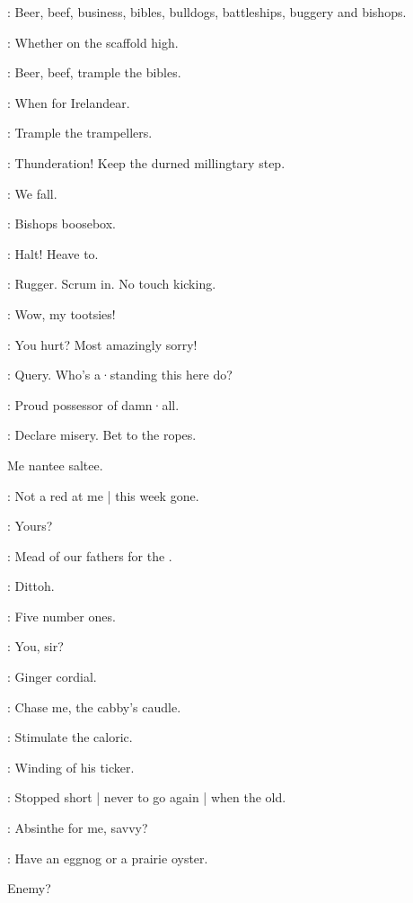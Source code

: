 \madden:
Beer,
beef,
business,
bibles,
bulldogs,
battleships,
buggery and bishops.%

\dixon:
Whether on the scaffold high.

\madden:
Beer,
beef,
trample the bibles.

\dixon:
When for Irelandear.

\crotthers:
Trample the trampellers.

\lenehan:
Thunderation!
Keep the durned millingtary step.

\madden:
We fall.

\dixon:
Bishops boosebox.

\punch:
Halt!
Heave to.

\dixon:
Rugger.
Scrum in.
No touch kicking.

\lynch:
Wow,
my tootsies!

\dixon:
You hurt?
Most amazingly sorry!


\lenehan:
Query.
Who's a·standing this here do?

\madden:
Proud possessor of damn·all.

\lynch:
Declare misery.
Bet to the ropes.

\begin{omitted}
Me nantee saltee.
\end{omitted}

\dixon:
Not a red at me |
this week gone.

\barman:
Yours?

\stephen:
Mead of our fathers for the .

\bannon:
Dittoh.

\stephen:
Five number ones.

\barman:
You,
sir?

\Bloom:
Ginger cordial.

\bystander:
Chase me,
the cabby's caudle.

\Bloom:
Stimulate the caloric.

:
Winding of his ticker.

\Bloom:
Stopped short |
never to go again |
when the old.

\stephen:
Absinthe for me,
savvy?

\mulligan:
 Have an eggnog or a prairie oyster.

\begin{omitted}
Enemy?
\end{omitted}

